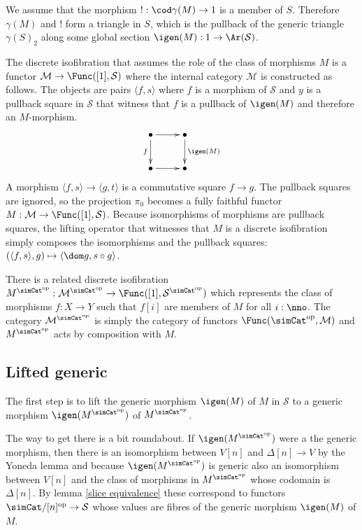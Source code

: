 \documentclass{tac}
\newcommand\hide[1]{}
\newcommand\cat\mathcal
\newcommand\dual{^{\mathrm{op}}}
\newcommand\s{^{\simCat\dual}}
\newcommand\bang{!}
\newcommand\of{:}
\newcommand\simplex\Delta
\newcommand\gen\gamma
\newcommand\pair[2]{\langle #1,#2\rangle}
\begin{document}
We assume that the morphism $\bang\of\cod\gen(M)\to 1$ is a member of $S$. Therefore $\gen(M)$ and $\bang$ form a triangle in $S$, which is the pullback of the generic triangle $\gen(S)_2$ along some global section $\igen(M)\of 1\to \Ar(\cat S)$.

The discrete isofibration that assumes the role of the class of morphisms $M$ is a functor $\cat M\to \Func([1],\cat S)$ where the internal category $\cat M$ is constructed as follows. The objects are pairs $\pair fs$ where $f$ is a morphism of $\cat S$ and $y$ is a pullback square in $\cat S$ that witness that $f$ is a pullback of $\igen(M)$ and therefore an $M$-morphism.
\[\xymatrix{
\bullet\ar[d]_f\ar[r] & \bullet\ar[d]^{\igen(M)}\\
\bullet\ar[r] & \bullet
}\]
A morphism $\pair fs\to \pair gt$ is a commutative square $f\to g$. The pullback squares are ignored, so the projection $\pi_0$ becomes a fully faithful functor $M\of\cat M\to \Func([1],\cat S)$. Because isomorphisms of morphisms are pullback squares, the lifting operator that witnesses that $M$ is a discrete isofibration simply composes the isomorphisms and the pullback squares: $(\pair fs,g)\mapsto \pair {\dom g}{s\circ g}$.

There is a related discrete isofibration $M\s\of \cat M\s\to \Func([1],\cat S\s)$ which represents the class of morphisms $f\of X\to Y$ such that $f[i]$ are members of $M$ for all $i\of \nno$. The category $\cat M\s$ is simply the category of functors $\Func(\simCat\dual,\cat M)$ and $M\s$ acts by composition with $M$.

\hide{ Is dit genoeg? }


\subsection{Lifted generic}
The first step is to lift the generic morphism $\igen(M)$ of $M$ in $\cat S$ to a generic morphism $\igen(M\s)$ of $M\s$.

The way to get there is a bit roundabout. If $\igen(M\s)$ were a the generic morphism, then there is an isomorphism between $V[n]$ and $\simplex[n]\to V$ by the Yoneda lemma and because $\igen(M\s)$ is generic also an isomorphism between $V[n]$ and the class of morphisms in $M\s$ whose codomain is $\simplex[n]$. By lemma \ref{slice equivalence} these correspond to functors $\simCat/[n]\dual\to\cat S$ whose values are fibres of the generic morphism $\igen(M)$ of $M$. 
\end{document}
